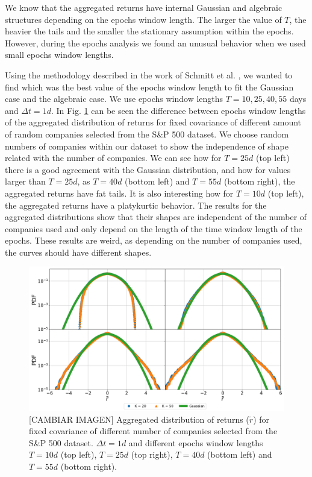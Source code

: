 We know that the aggregated returns have internal Gaussian and algebraic
structures depending on the epochs window length. The larger the value of $T$,
the heavier the tails and the smaller the stationary assumption within the
epochs. However, during the epochs analysis we found an unusual behavior when
we used small epochs window lengths.

Using the methodology described in the work of Schmitt et al.
\cite{non_stationarity_fin_guhr}, we wanted to find which was the best value of
the epochs window length to fit the Gaussian case and the algebraic case. We
use epochs window lengths $T = 10, 25, 40, 55$ days and $\Delta t = 1d$. In
Fig. \ref{fig:window_comparison} can be seen the difference between epochs
window lengths of the aggregated distribution of returns for fixed covariance
of different amount of random companies selected from the S\&P 500 dataset. We
choose random numbers of companies within our dataset to show the independence
of shape related with the number of companies. We can see how for $T=25d$
(top left) there is a good agreement with the Gaussian distribution, and how
for values larger than $T=25d$, as $T=40d$ (bottom left) and $T=55d$
(bottom right), the aggregated returns have fat tails. It is also interesting
how for $T=10d$ (top left), the aggregated returns have a platykurtic behavior.
The results for the aggregated distributions show that their shapes are
independent of the number of companies used and only depend on the length of
the time window length of the epochs. These results are weird, as depending on
the number of companies used, the curves should have different shapes.

\begin{figure}[htbp]
    \centering
    \includegraphics[width=0.8\columnwidth]
    {figures/05_window_comparison.png}
    \caption{[CAMBIAR IMAGEN] Aggregated distribution of returns ($\tilde{r}$) for fixed
             covariance of different number of companies selected from the S\&P
             500 dataset. $\Delta t = 1d$ and different epochs window lengths
             $T=10d$ (top left), $T=25d$ (top right), $T=40d$ (bottom left) and
             $T=55d$ (bottom right).}
    \label{fig:window_comparison}
\end{figure}


